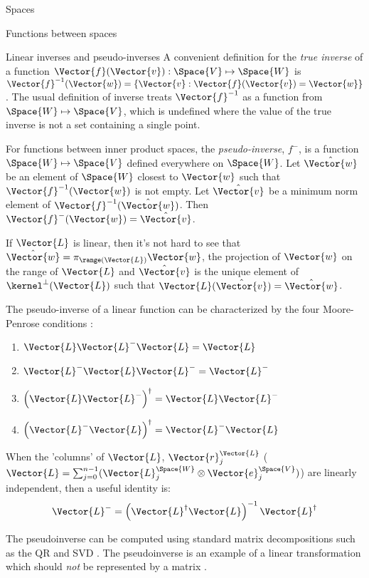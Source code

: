 \begin{plSection}{Spaces}
\begin{plSection}{Functions between spaces}
\begin{plSection}{Linear inverses and pseudo-inverses}
A convenient definition for the \textit{true inverse}
of a function $\Vector{f}(\Vector{v}):\Space{V} \mapsto \Space{W}$ is
$\Vector{f}^{-1}(\Vector{w}) = \{ \Vector{v} : \Vector{f}(\Vector{v}) = \Vector{w} \}$.
The usual definition of inverse treats $\Vector{f}^{-1}$
as a function from $\Space{W} \mapsto \Space{V}$,
which is undefined where the value of the true
inverse is not a set containing a single point.

For functions between inner product spaces,
the \textit{pseudo-inverse}, $f^{-}$, is a function $\Space{W} \mapsto \Space{V}$
defined everywhere on $\Space{W}$.
Let $\hat{\Vector{w}}$ be an element of $\Space{W}$ closest to $\Vector{w}$
such that $\Vector{f}^{-1}(\Vector{w})$ is not empty.
Let $\hat{\Vector{v}}$ be a minimum norm element of $\Vector{f}^{-1}(\hat{\Vector{w}})$.
Then $\Vector{f}^{-}(\Vector{w}) = \hat{\Vector{v}}$.

If $\Vector{L}$ is linear, then it's not hard to see that
$\hat{\Vector{w}} = \pi_{\range(\Vector{L})} \Vector{w}$, the projection of $\Vector{w}$
on the range of $\Vector{L}$
and
$\hat{\Vector{v}}$ is the unique element of $\kernel^{\perp}(\Vector{L})$
such that $\Vector{L}(\hat{\Vector{v}}) = \hat{\Vector{w}}$.

The pseudo-inverse of a linear function can be characterized
by the four Moore-Penrose 
conditions :
\begin{enumerate}
\item $\Vector{L} \Vector{L}^{-} \Vector{L} = \Vector{L}$
\item $\Vector{L}^{-} \Vector{L} \Vector{L}^{-} = \Vector{L}^{-}$
\item $\left( \Vector{L} \Vector{L}^{-} \right)^{\dagger} = \Vector{L} \Vector{L}^{-}$
\item $\left( \Vector{L}^{-} \Vector{L} \right)^{\dagger} = \Vector{L}^{-} \Vector{L}$
\end{enumerate}

When the 'columns' of $\Vector{L}$, $\Vector{r}_j^{\Vector{L}}$
($\Vector{L} = \sum_{j=0}^{n-1} ( \Vector{L}_j^{\Space{W}} \otimes \Vector{e}_j^{\Space{V}} )$)
are linearly independent,
then a useful identity is:
\begin{equation}
\label{eq:full-rank-pseudo-inverse}
\Vector{L}^{-} = \left( \Vector{L}^{\dagger} \Vector{L} \right)^{-1} \Vector{L}^{\dagger}
\end{equation}

The pseudoinverse can be computed
using standard matrix decompositions such as
the QR and SVD .
The pseudoinverse is an example of a linear transformation
which should {\em not} be represented by a matrix
.


\end{plSection}
\end{plSection}
\end{plSection}
